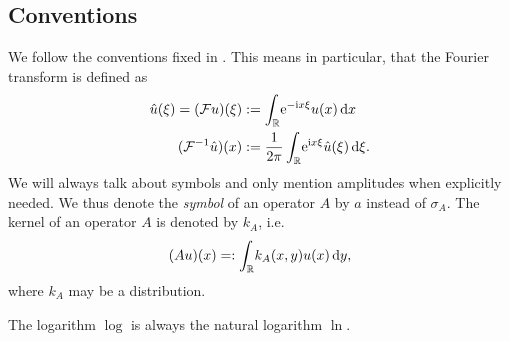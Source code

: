 \subsection{Conventions}
We follow the conventions fixed in \cite{Les:PDO}. This means in particular,
that the Fourier transform is defined as
\begin{align*}
  \hat{u}(\xi) = (\mathcal{F}u)(\xi)
    &:= \Integ{\mathbb{R}}{x}{\Eto{-\mathrm ix\xi} u(x)} \\
  (\mathcal{F}^{-1}\hat{u})(x) &:=
  \frac{1}{2\pi}\Integ{\mathbb{R}}{\xi}{\Eto{\mathrm ix\xi}
    \hat{u}(\xi)}.
\end{align*}
We will always talk about symbols and only mention amplitudes when explicitly
needed. We thus denote the \emph{symbol} of an operator $A$ by $a$ instead of
$\sigma_A$. The kernel of an operator $A$ is denoted by $k_A$, i.e.\ 
\begin{align*}
  (Au)(x) =: \Integ{\mathbb{R}}{y}{k_A(x,y) u(x)},
\end{align*}
where $k_A$ may be a distribution.

The logarithm $\log$ is always the natural logarithm $\ln$.
